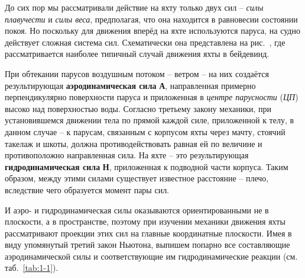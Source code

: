 До сих пор мы рассматривали действие на яхту только двух сил \--- \textit{силы
плавучести} и \textit{силы веса},
предполагая, что она находится в равновесии состоянии покоя. Но
поскольку для движения вперёд на яхте используются паруса, на судно
действует сложная система сил. Схематически она представлена на
рис.~, где рассматривается наиболее типичный случай движения
яхты в бейдевинд.

При обтекании парусов воздушным потоком \--- ветром \--- на них
создаётся результирующая \textbf{аэродинамическая
  сила} \textbf{А}, направленная примерно
перпендикулярно поверхности паруса и приложенная в \textit{центре парусности}
(\textit{ЦП}) высоко над поверхностью
воды. Согласно третьему закону механики, при установившемся движении
тела по прямой каждой силе, приложенной к телу, в данном случае \--- к
парусам, связанным с корпусом яхты через мачту, стоячий такелаж и
шкоты, должна противодействовать равная ей по величине и
противоположно направленная сила. На яхте \--- это результирующая
\textbf{гидродинамическая сила}
\textbf{Н}, приложенная к подводной части корпуса. Таким образом,
между этими силами существует известное расстояние \--- плечо,
вследствие чего образуется момент пары сил.

И аэро- и гидродинамическая силы оказываются ориентированными не в
плоскости, а в пространстве, поэтому при изучении механики движения
яхты рассматривают проекции этих сил на главные координатные
плоскости. Имея в виду упомянутый третий закон Ньютона, выпишем
попарно все составляющие аэродинамической силы и соответствующие им
гидродинамические реакции (см. таб.~\ref{tab:1-1}).

